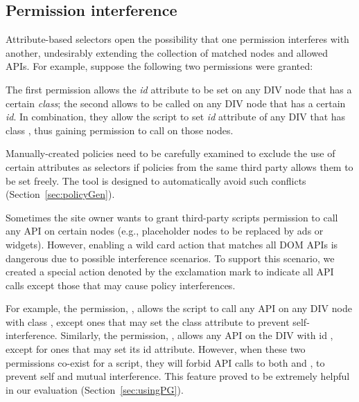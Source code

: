   \begin{algorithmic}[1]
		\Statex {}\par
		\Statex {}\par
  \end{algorithmic}

\subsection{Permission interference}\label{sec:interference}

Attribute-based selectors open the possibility that one permission
interferes with another, undesirably extending the collection of matched
nodes and allowed APIs.  For example, suppose the following two
permissions were granted:

  \begin{algorithmic}[1]
		\Statex {}\par
		\Statex {}\par
  \end{algorithmic}

The first permission allows the \emph{id} attribute to be set on any
DIV node that has a certain \emph{class}; the second allows
 to be called on any DIV node that has a
certain \emph{id}.  In combination, they allow the script to set
\emph{id} attribute of any DIV that has class ,
thus gaining permission to call  on those
nodes.

Manually-created policies need to be carefully examined to exclude the
use of certain attributes as selectors if policies from the same third
party allows them to be set freely.  The \pg tool is designed to
automatically avoid such conflicts (Section~\ref{sec:policyGen}).

Sometimes the site owner wants to grant third-party scripts permission
to call any API on certain nodes (e.g., placeholder nodes to be replaced
by ads or widgets).  However, enabling a wild card action that matches
all DOM APIs is dangerous due to possible interference scenarios.  To
support this scenario, we created a special action denoted by the
exclamation mark to indicate all API calls except those that may cause
policy interferences.  

For example, the permission, , allows the script to
call any API on any DIV node with class , except ones that
may set the class attribute to prevent self-interference.  Similarly,
the permission, , allows any API on the
DIV with id , except for ones that may set its id attribute.
However, when these two permissions co-exist for a script, they will
forbid API calls to both  and , to prevent self and mutual
interference.  This feature proved to be extremely helpful in our
evaluation (Section~\ref{sec:usingPG}).

